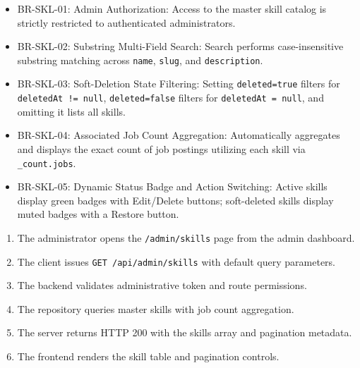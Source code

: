 \begin{itemize}[leftmargin=1.6em,topsep=3pt,itemsep=2pt,parsep=0pt,label=$\bullet$]\brrulelist
    \item BR-SKL-01: Admin Authorization: Access to the master skill catalog is strictly restricted to authenticated administrators.
    \item BR-SKL-02: Substring Multi-Field Search: Search performs case-insensitive substring matching across \texttt{name}, \texttt{slug}, and \texttt{description}.
    \item BR-SKL-03: Soft-Deletion State Filtering: Setting \texttt{deleted=true} filters for \texttt{deletedAt != null}, \texttt{deleted=false} filters for \texttt{deletedAt = null}, and omitting it lists all skills.
    \item BR-SKL-04: Associated Job Count Aggregation: Automatically aggregates and displays the exact count of job postings utilizing each skill via \texttt{\_count.jobs}.
    \item BR-SKL-05: Dynamic Status Badge and Action Switching: Active skills display green badges with Edit/Delete buttons; soft-deleted skills display muted badges with a Restore button.
\end{itemize}

\begin{enumerate}[leftmargin=1.6em,topsep=3pt,itemsep=2pt,parsep=0pt]
    \item The administrator opens the \texttt{/admin/skills} page from the admin dashboard.
    \item The client issues \texttt{GET /api/admin/skills} with default query parameters.
    \item The backend validates administrative token and route permissions.
    \item The repository queries master skills with job count aggregation.
    \item The server returns HTTP 200 with the skills array and pagination metadata.
    \item The frontend renders the skill table and pagination controls.
\end{enumerate}

